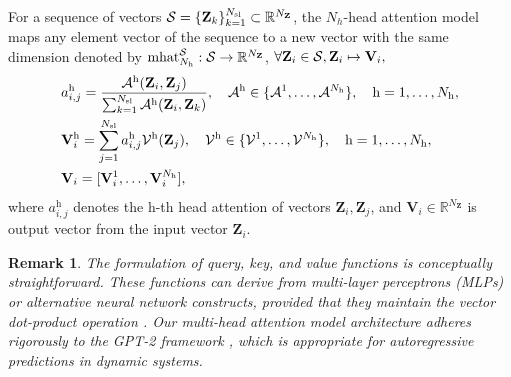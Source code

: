 \documentclass{article}
\newtheorem{remark}{Remark}
\begin{document}
For a sequence of vectors $\mathcal{S} = \{\mathbf{Z}_k\}_{k=1}^{N_\mathrm{sl}}\subset \mathbb{R}^{N_\mathbf{Z}}$, the $N_h$-head attention model maps any element vector of the sequence to a new vector with the same dimension denoted by $\mathrm{mhat}^{\mathcal{S}}_{N_\mathrm{h}}:\mathcal{S}\rightarrow \mathbb{R}^{N_{\mathbf{Z}}}$, $\forall\mathbf{Z}_i\in \mathcal{S}, \mathbf{Z}_i\mapsto\mathbf{V}_i,$
\begin{equation}
    \begin{split}
    &a_{i,j}^\mathrm{h}=\frac{\mathcal{A}^\mathrm{h}(\mathbf{Z}_i,\mathbf{Z}_j)}{\sum_{k=1}^{N_\mathrm{sl}}\mathcal{A}^\mathrm{h}(\mathbf{Z}_i,\mathbf{Z}_k)}, \quad \mathcal{A}^\mathrm{h}\in\{\mathcal{A}^1,\dots,\mathcal{A}^{N_\mathrm{h}}\},\quad \mathrm{h}=1,\dots,N_{\mathrm{h}},\\
    &\mathbf{V}^\mathrm{h}_i=\sum_{j=1}^{N_\mathrm{sl}} a^\mathrm{h}_{i,j}\mathcal{V}^\mathrm{h}(\mathbf{Z}_j),\quad\mathcal{V}^\mathrm{h}\in\{\mathcal{V}^1,\dots,\mathcal{V}^{N_\mathrm{h}}\},\quad \mathrm{h}=1,\dots,N_{\mathrm{h}},\\
    &\mathbf{V}_i=[\mathbf{V}^1_i,\dots,\mathbf{V}^{N_\mathrm{h}}_i],
    \end{split}
\end{equation}
where $a^\mathrm{h}_{i,j}$ denotes the $\mathrm{h}$-th head attention of vectors $\mathbf{Z}_i,\mathbf{Z}_j$, and $\mathbf{V}_i\in\mathbb{R}^{N_\mathbf{Z}}$ is output vector from the input vector $\mathbf{Z}_i$. 

\begin{remark}
The formulation of query, key, and value functions is conceptually straightforward. These functions can derive from multi-layer perceptrons (MLPs) or alternative neural network constructs, provided that they maintain the vector dot-product operation \cite{vaswani2017attention}. Our multi-head attention model architecture adheres rigorously to the GPT-2 framework \cite{radford2019language}, which is appropriate for autoregressive predictions in dynamic systems.
\end{remark}
\end{document}
